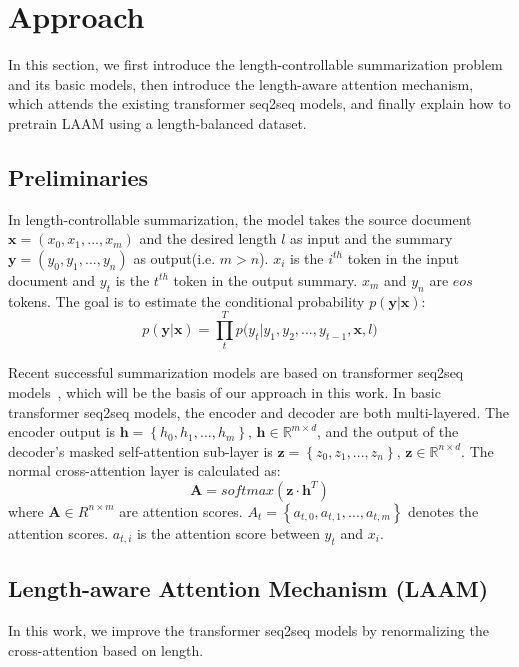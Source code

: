 \section{Approach}
\label{sec:approach}
In this section, 
we first introduce the length-controllable summarization problem and its basic models,
then introduce the length-aware attention mechanism, which attends the existing
transformer seq2seq models, and finally explain how to pretrain LAAM using 
a length-balanced dataset. 

\subsection{Preliminaries}
In length-controllable summarization, the model takes the source document 
$\mathbf{x} = (x_{0},x_{1},...,x_{m})$ and the desired length $l$ as input and the summary $\mathbf{y} = (y_{0},y_{1},..., y_{n})$ as output(i.e. $m>n$).
$x_i$ is the $i^{th}$ token in the input document and
$y_t$ is the $t^{th}$ token in the output summary.
$x_{m}$ and $y_{n}$ are $eos$ tokens.
The goal is to estimate the conditional probability
$p(\mathbf{y}|\mathbf{x})$:
\begin{equation}
	p(\mathbf{y} | \mathbf{x}) \!=\! {\prod^T_{t} {p(y_{t} | y_{1}, y_{2},..., y_{t-1}, \mathbf{x},l})}
\end{equation}

Recent successful summarization models are based on transformer 
seq2seq models~\cite{attn17}, which will be the basis of our approach in
this work.  
In basic transformer seq2seq models, the encoder and decoder are both
multi-layered. The encoder output is $\mathbf{h}=\left\{h_0,h_1,...,h_m\right\}$,  
$\mathbf{h} \in \mathbb{R}^{m \times d}$,
and the output of the decoder's masked self-attention sub-layer 
is $\mathbf{z}=\left\{z_0,z_1,...,z_n\right\}$,
$\mathbf{z} \in \mathbb{R}^{n \times d}$.
The normal cross-attention layer is calculated as:
\begin{equation}
	\mathbf{A}=softmax(\textbf{z} \cdot \textbf{h}^T)
\end{equation}
where $\mathbf{A} \in R^{n\times m}$ are attention scores.
$A_{t}=\left\{a_{t,0}, a_{t,1},...,a_{t,m}\right\}$ denotes the attention scores. %
$a_{t,i}$ is the attention score between $y_t$ and $x_i$.



\subsection{Length-aware Attention Mechanism (LAAM)}
\label{sec:model} 
In this work, we improve the transformer seq2seq models by renormalizing 
the cross-attention based on length.

